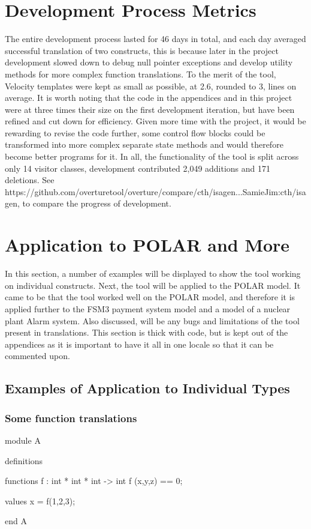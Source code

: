 \section{Development Process Metrics}
The entire development process lasted for 46 days in total, and each day averaged successful translation of two constructs, this is because later in the project development slowed down to debug null pointer exceptions and develop utility methods for more complex function translations. To the merit of the tool, Velocity templates were kept as small as possible, at 2.6, rounded to 3, lines on average. It is worth noting that the code in the appendices and in this project were at three times their size on the first development iteration, but have been refined and cut down for efficiency. Given more time with the project, it would be rewarding to revise the code further, some control flow blocks could be transformed into more complex separate state methods and would therefore become better programs for it. In all, the functionality of the tool is split across only 14 visitor classes, development contributed 2,049 additions and 171 deletions. See https://github.com/overturetool/overture/compare/cth/isagen...SamieJim:cth/isagen, to compare the progress of development.

\section{Application to POLAR and More} \label{atp}
In this section, a number of examples will be displayed to show the tool working on individual constructs. Next, the tool will be applied to the POLAR model. It came to be that the tool worked well on the POLAR model, and therefore it is applied further to the FSM3 payment system model and a model of a nuclear plant Alarm system. Also discussed, will be any bugs and limitations of the tool present in translations. This section is thick with code, but is kept out of the appendices as it is important to have it all in one locale so that it can be commented upon.

\subsection{Examples of Application to Individual Types}  
\subsubsection{Some function translations}
\begin{vdmsl}
module A

definitions

functions
f : int * int * int -> int
f (x,y,z) == 0;

values
x = f(1,2,3);

end A
\end{vdmsl}

